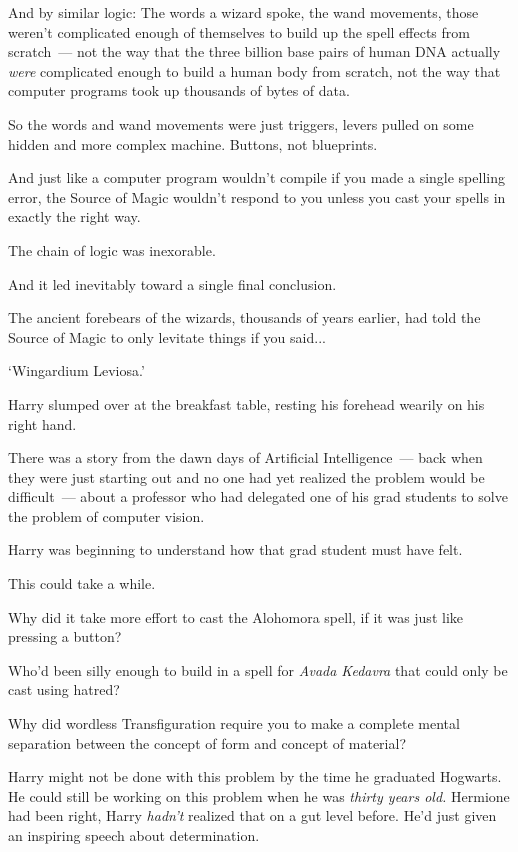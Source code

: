 And by similar logic: The words a wizard spoke, the wand movements, those weren't complicated enough of themselves to build up the spell effects from scratch~--- not the way that the three billion base pairs of human DNA actually \emph{were} complicated enough to build a human body from scratch, not the way that computer programs took up thousands of bytes of data.

So the words and wand movements were just triggers, levers pulled on some hidden and more complex machine. Buttons, not blueprints.

And just like a computer program wouldn't compile if you made a single spelling error, the Source of Magic wouldn't respond to you unless you cast your spells in exactly the right way.

The chain of logic was inexorable.

And it led inevitably toward a single final conclusion.

The ancient forebears of the wizards, thousands of years earlier, had told the Source of Magic to only levitate things if you said...

`Wingardium Leviosa.'

Harry slumped over at the breakfast table, resting his forehead wearily on his right hand.

There was a story from the dawn days of Artificial Intelligence~--- back when they were just starting out and no one had yet realized the problem would be difficult~--- about a professor who had delegated one of his grad students to solve the problem of computer vision.

Harry was beginning to understand how that grad student must have felt.

This could take a while.

Why did it take more effort to cast the Alohomora spell, if it was just like pressing a button?

Who'd been silly enough to build in a spell for \emph{Avada Kedavra} that could only be cast using hatred?

Why did wordless Transfiguration require you to make a complete mental separation between the concept of form and concept of material?

Harry might not be done with this problem by the time he graduated Hogwarts. He could still be working on this problem when he was \emph{thirty years old.} Hermione had been right, Harry \emph{hadn't} realized that on a gut level before. He'd just given an inspiring speech about determination.

